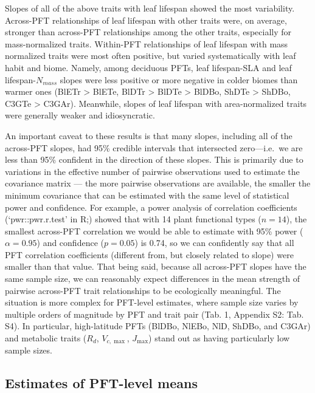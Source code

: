 \documentclass{article}
\begin{document}
Slopes of all of the above traits with leaf lifespan showed the most variability.
Across-PFT relationships of leaf lifespan with other traits were, on average, stronger than across-PFT relationships among the other traits, especially for mass-normalized traits.
Within-PFT relationships of leaf lifespan with mass normalized traits were most often positive, but varied systematically with leaf habit and biome.
Namely, among deciduous PFTs, leaf lifespan-SLA and leaf lifespan-$N_{mass}$ slopes were less positive or more negative in colder biomes than warmer ones
(BlETr > BlETe, BlDTr > BlDTe > BlDBo, ShDTe > ShDBo, C3GTe > C3GAr).
Meanwhile, slopes of leaf lifespan with area-normalized traits were generally weaker and idiosyncratic.

An important caveat to these results is that many slopes, including all of the across-PFT slopes, had 95\% credible intervals that intersected zero---i.e.\ we are less than 95\% confident in the direction of these slopes.
This is primarily due to variations in the effective number of pairwise observations used to estimate the covariance matrix ---
the more pairwise observations are available, the smaller the minimum covariance that can be estimated with the same level of statistical power and confidence.
For example, a power analysis of correlation coefficients (`pwr::pwr.r.test' in R;\@\citealt{r_pwr_package}) showed that with 14 plant functional types ($n = 14$),
the smallest across-PFT correlation we would be able to estimate with 95\% power ($\alpha = 0.95$) and confidence ($p = 0.05$) is 0.74,
so we can confidently say that all PFT correlation coefficients (different from, but closely related to slope) were smaller than that value.
That being said, because all across-PFT slopes have the same sample size,
we can reasonably expect differences in the mean strength of pairwise across-PFT trait relationships to be ecologically meaningful.
The situation is more complex for PFT-level estimates, where sample size varies by multiple orders of magnitude by PFT and trait pair (Tab. 1, Appendix S2: Tab. S4).
In particular, high-latitude PFTs (BlDBo, NlEBo, NlD, ShDBo, and C3GAr) and metabolic traits ($R_d$, $V_{c,\max}$, $J_{\max}$) stand out as having particularly low sample sizes.

\subsection{Estimates of PFT-level means}
\end{document}
